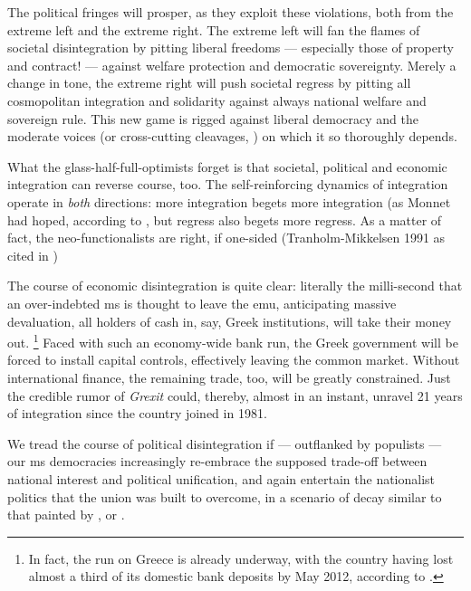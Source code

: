 The political fringes will prosper, as they exploit these violations, both from the extreme left and the extreme right.
The extreme left will fan the flames of societal disintegration by pitting liberal freedoms --- especially those of property and contract! --- against welfare protection and democratic sovereignty.
Merely a change in tone, the extreme right will push societal regress by pitting all cosmopolitan integration and solidarity against always national welfare and sovereign rule.
This new game is rigged against liberal democracy and the moderate voices (or cross-cutting cleavages, \citealt{LipsetRokkan-1967-aa}) on which it so thoroughly depends.

What the glass-half-full-optimists forget is that societal, political and economic integration can reverse course, too.
The self-reinforcing dynamics of integration operate in \emph{both} directions:
more integration begets more integration (as Monnet had hoped, according to \cite[948]{Schmitter1999}, but regress also begets more regress.
As a matter of fact, the neo-functionalists are right, if one-sided (Tranholm-Mikkelsen 1991 as cited in \citealt[1]{Bieler2003})

The course of economic disintegration is quite clear:
literally the milli-second that an over-indebted \gls{ms} is thought to leave the \gls{emu}, anticipating massive devaluation, all holders of cash in, say, Greek institutions, will take their money out.
\footnote{
	In fact, the run on Greece is already underway, with the country having lost almost a third of its domestic bank deposits by May 2012, according to \cite{TheEconomist2012}.
}
Faced with such an economy-wide bank run, the Greek government will be forced to install capital controls, effectively leaving the common market.
Without international finance, the remaining trade, too, will be greatly constrained.
Just the credible rumor of \emph{Grexit} could, thereby, almost in an instant, unravel 21 years of integration since the country joined in 1981.

We tread the course of political disintegration if --- outflanked by populists --- our \gls{ms} democracies increasingly re-embrace the supposed trade-off between national interest and political unification, and again entertain the nationalist politics that the union was built to overcome, in a scenario of decay similar to that painted by \cite[339ff]{BeckGrande-2007-aa}, or \cite[947]{Schmitter1999}.

